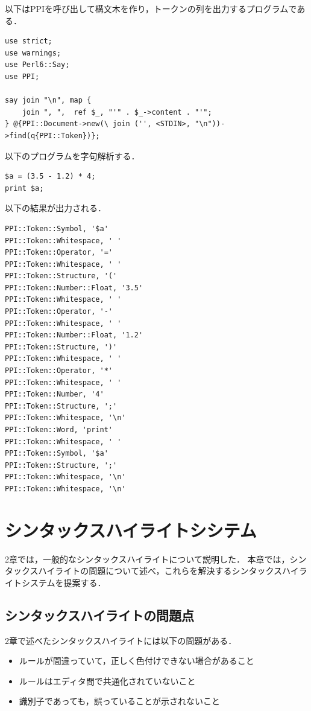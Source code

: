 \documentclass{cs-thesis}
\begin{document}
以下はPPIを呼び出して構文木を作り，トークンの列を出力するプログラムである．

\begin{framed}
\begin{verbatim}
use strict;
use warnings;
use Perl6::Say;
use PPI;

say join "\n", map {
    join ", ",  ref $_, "'" . $_->content . "'";
} @{PPI::Document->new(\ join ('', <STDIN>, "\n"))->find(q{PPI::Token})};
\end{verbatim}
\end{framed}

以下のプログラムを字句解析する．

\begin{framed}
\begin{verbatim}
$a = (3.5 - 1.2) * 4;
print $a;
\end{verbatim}
\end{framed}

以下の結果が出力される．

\begin{framed}
\begin{verbatim}
PPI::Token::Symbol, '$a'
PPI::Token::Whitespace, ' '
PPI::Token::Operator, '='
PPI::Token::Whitespace, ' '
PPI::Token::Structure, '('
PPI::Token::Number::Float, '3.5'
PPI::Token::Whitespace, ' '
PPI::Token::Operator, '-'
PPI::Token::Whitespace, ' '
PPI::Token::Number::Float, '1.2'
PPI::Token::Structure, ')'
PPI::Token::Whitespace, ' '
PPI::Token::Operator, '*'
PPI::Token::Whitespace, ' '
PPI::Token::Number, '4'
PPI::Token::Structure, ';'
PPI::Token::Whitespace, '\n'
PPI::Token::Word, 'print'
PPI::Token::Whitespace, ' '
PPI::Token::Symbol, '$a'
PPI::Token::Structure, ';'
PPI::Token::Whitespace, '\n'
PPI::Token::Whitespace, '\n'
\end{verbatim}
\end{framed}

  \clearpage
 \section{シンタックスハイライトシシテム}
 2章では，一般的なシンタックスハイライトについて説明した．
 本章では，シンタックスハイライトの問題について述べ，これらを解決するシンタックスハイライトシステムを提案する．

  \subsection{シンタックスハイライトの問題点}
  2章で述べたシンタックスハイライトには以下の問題がある．
  \begin{itemize}
   \item ルールが間違っていて，正しく色付けできない場合があること
   \item ルールはエディタ間で共通化されていないこと
   \item 識別子であっても，誤っていることが示されないこと
  \end{itemize}
\end{document}
